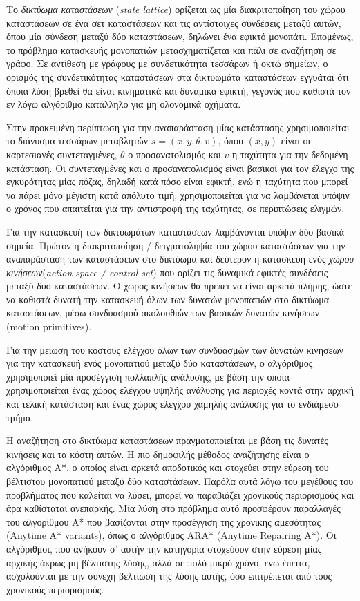 \bigskip
Το \textit{δικτύωμα καταστάσεων} (\textit{state lattice}) ορίζεται ως μία διακριτοποίηση του χώρου καταστάσεων σε ένα σετ καταστάσεων και τις αντίστοιχες συνδέσεις μεταξύ αυτών, όπου μία σύνδεση μεταξύ δύο καταστάσεων, δηλώνει ένα εφικτό μονοπάτι. Επομένως, το πρόβλημα κατασκευής μονοπατιών μετασχηματίζεται και πάλι σε αναζήτηση σε γράφο. Σε αντίθεση με γράφους με συνδετικότητα τεσσάρων ή οκτώ σημείων, ο ορισμός της συνδετικότητας καταστάσεων στα δικτυωμάτα καταστάσεων εγγυάται ότι όποια λύση βρεθεί θα είναι κινηματικά και δυναμικά εφικτή, γεγονός που καθιστά τον εν λόγω αλγόριθμο κατάλληλο για μη ολονομικά οχήματα.

\bigskip
Στην προκειμένη περίπτωση για την αναπαράσταση μίας κατάστασης χρησιμοποιείται το διάνυσμα τεσσάρων μεταβλητών $s=(x, y, \theta, v)$, όπου $(x, y)$ είναι οι καρτεσιανές συντεταγμένες, $\theta$ ο προσανατολισμός και $v$ η ταχύτητα για την δεδομένη κατάσταση. Οι συντεταγμένες και ο προσανατολισμός είναι βασικοί για τον έλεγχο της εγκυρότητας μίας πόζας, δηλαδή κατά πόσο είναι εφικτή, ενώ η ταχύτητα που μπορεί να πάρει μόνο μέγιστη κατά απόλυτο τιμή, χρησιμοποιείται για να λαμβάνεται υπόψιν ο χρόνος που απαιτείται για την αντιστροφή της ταχύτητας, σε περιπτώσεις ελιγμών.

\bigskip
Για την κατασκευή των δικτυωμάτων καταστάσεων λαμβάνονται υπόψιν δύο βασικά σημεία. Πρώτον η  διακριτοποίηση / δειγματοληψία του χώρου καταστάσεων για την αναπαράσταση των καταστάσεων στο δικτύωμα και δεύτερον η κατασκευή ενός \textit{χώρου κινήσεων}(\textit{action space / control set}) που ορίζει τις δυναμικά εφικτές συνδέσεις μεταξύ δυο καταστάσεων. Ο χώρος κινήσεων θα πρέπει να είναι αρκετά πλήρης, ώστε να καθιστά δυνατή την κατασκευή όλων των δυνατών μονοπατιών στο δικτύωμα καταστάσεων, μέσω συνδυασμού ακολουθιών των βασικών δυνατών κινήσεων (motion primitives).

\bigskip
Για την μείωση του κόστους ελέγχου όλων των συνδυασμών των δυνατών κινήσεων για την κατασκευή ενός μονοπατιού μεταξύ δύο καταστάσεων, ο αλγόριθμος χρησιμοποιεί μία προσέγγιση πολλαπλής ανάλυσης, με βάση την οποία χρησιμοποιείται ένας χώρος ελέγχου υψηλής ανάλυσης για περιοχές κοντά στην αρχική και τελική κατάσταση και ένας χώρος ελέγχου χαμηλής ανάλυσης για το ενδιάμεσο τμήμα.

\bigskip
Η αναζήτηση στο δικτύωμα καταστάσεων πραγματοποιείται με βάση τις δυνατές κινήσεις και τα κόστη αυτών. Η πιο δημοφιλής μέθοδος αναζήτησης είναι ο αλγόριθμος A*, ο οποίος είναι αρκετά αποδοτικός και στοχεύει στην εύρεση του βέλτιστου μονοπατιού μεταξύ δύο καταστάσεων. Παρόλα αυτά λόγω του μεγέθους του προβλήματος που καλείται να λύσει, μπορεί να παραβιάζει χρονικούς περιορισμούς και άρα καθίσταται ανεπαρκής. Μία λύση στο πρόβλημα αυτό προσφέρουν παραλλαγές του αλγορίθμου A* που βασίζονται στην προσέγγιση της χρονικής αμεσότητας (Anytime A* variants), όπως ο αλγόριθμος ARA* (Anytime Repairing A*). Οι αλγόριθμοι, που ανήκουν σ' αυτήν την κατηγορία στοχεύουν στην εύρεση μίας αρχικής άκρως μη βέλτιστης λύσης, αλλά σε πολύ μικρό χρόνο, ενώ έπειτα, ασχολούνται με την συνεχή βελτίωση της λύσης αυτής, όσο επιτρέπεται από τους χρονικούς περιορισμούς.

